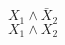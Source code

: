 \documentclass[preview]{standalone}
\begin{document}
\begin{center}
${X_{1} \land \bar X_{2}}$ \\ ${X_{1} \land X_{2}}$
\end{center}
\end{document}
